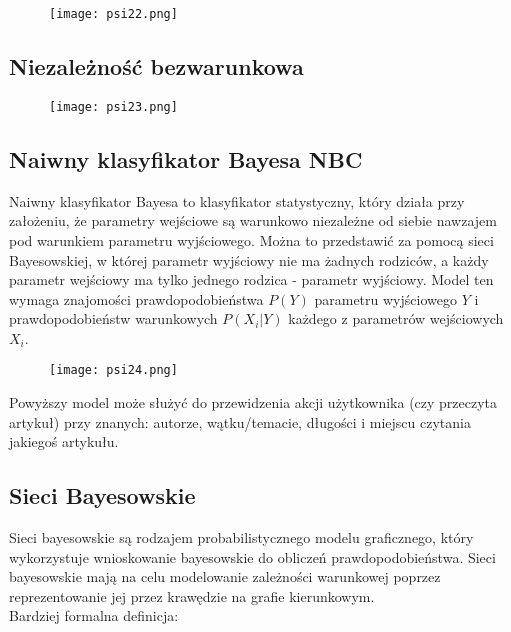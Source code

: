\documentclass[a4paper,15pt]{article}
\begin{document}
\begin{figure}[H]
\centerline{\texttt{[image: psi22.png]}}
\end{figure}

\subsection{Niezależność bezwarunkowa}

\begin{figure}[H]
\centerline{\texttt{[image: psi23.png]}}
\end{figure}

\subsection{Naiwny klasyfikator Bayesa NBC}

Naiwny klasyfikator Bayesa to klasyfikator statystyczny, który działa przy założeniu, że parametry wejściowe są warunkowo niezależne od siebie nawzajem pod warunkiem parametru wyjściowego. Można to przedstawić za pomocą sieci Bayesowskiej, w której parametr wyjściowy nie ma żadnych rodziców, a każdy parametr wejściowy ma tylko jednego rodzica - parametr wyjściowy. Model ten wymaga znajomości prawdopodobieństwa $P(Y)$ parametru wyjściowego $Y$ i prawdopodobieństw warunkowych $P(X_i | Y)$ każdego z parametrów wejściowych $X_i$.

\begin{figure}[H]
\centerline{\texttt{[image: psi24.png]}}
\end{figure}

Powyższy model może służyć do przewidzenia akcji użytkownika (czy przeczyta artykuł) przy znanych: autorze, wątku/temacie, długości i miejscu czytania jakiegoś artykułu. 


\subsection{Sieci Bayesowskie}
Sieci bayesowskie są rodzajem probabilistycznego modelu graficznego, który wykorzystuje wnioskowanie bayesowskie do obliczeń prawdopodobieństwa. Sieci bayesowskie mają na celu modelowanie zależności warunkowej poprzez reprezentowanie jej przez krawędzie na grafie kierunkowym. \\

Bardziej formalna definicja: \\
\end{document}
